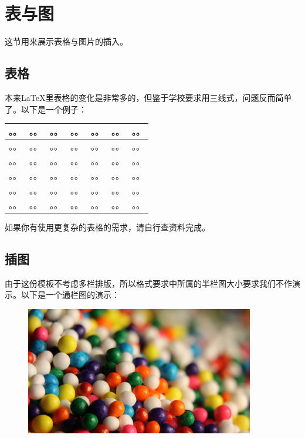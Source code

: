 \section{表与图}这节用来展示表格与图片的插入。

\subsection{表格}
\par 本来LaTeX里表格的变化是非常多的，但鉴于学校要求用三线式，问题反而简单了。以下是一个例子：
\begin{table}[htbp]\center
    \begin{tabular}{lcccccl}
     \toprule
     。。 & 。。 & 。。 & 。。 & 。。& 。。 & 。。\\
     \midrule
    。。 & 。。 & 。。 & 。。 & 。。& 。。 & 。。\\
    。。 & 。。 & 。。 & 。。 & 。。& 。。 & 。。\\
    。。 & 。。 & 。。 & 。。 & 。。& 。。 & 。。\\
    。。 & 。。 & 。。 & 。。 & 。。& 。。 & 。。\\
    。。 & 。。 & 。。 & 。。 & 。。& 。。 & 。。\\
     \bottomrule
    \end{tabular}
   \end{table}
如果你有使用更复杂的表格的需求，请自行查资料完成。

\subsection{插图}
由于这份模板不考虑多栏排版，所以格式要求中所属的半栏图大小要求我们不作演示。以下是一个通栏图的演示：
\begin{figure}[H]
    \centering
    \includegraphics[width=100mm]{./figures/figure_example1.jpg}
  \end{figure}

